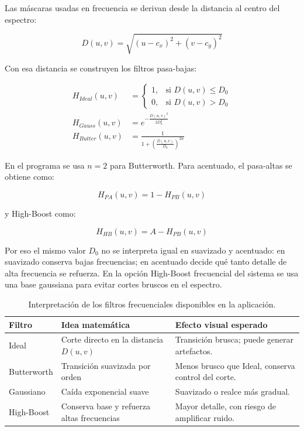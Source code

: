 \documentclass[11pt]{article}
\begin{document}
Las máscaras usadas en frecuencia se derivan desde la distancia al centro del espectro:

\begin{equation}
    D(u,v)=\sqrt{(u-c_x)^2+(v-c_y)^2}
\end{equation}

Con esa distancia se construyen los filtros pasa-bajas:

\begin{align}
    H_{Ideal}(u,v) &=
    \begin{cases}
        1, & \text{si } D(u,v)\leq D_0\\
        0, & \text{si } D(u,v)>D_0
    \end{cases} \\
    H_{Gauss}(u,v) &= e^{-\frac{D(u,v)^2}{2D_0^2}} \\
    H_{Butter}(u,v) &= \frac{1}{1+\left(\frac{D(u,v)}{D_0}\right)^{2n}}
\end{align}

En el programa se usa $n=2$ para Butterworth. Para acentuado, el pasa-altas se obtiene como:

\begin{equation}
    H_{PA}(u,v)=1-H_{PB}(u,v)
\end{equation}

y High-Boost como:

\begin{equation}
    H_{HB}(u,v)=A-H_{PB}(u,v)
\end{equation}

Por eso el mismo valor $D_0$ no se interpreta igual en suavizado y acentuado: en suavizado conserva bajas frecuencias; en acentuado decide qué tanto detalle de alta frecuencia se refuerza. En la opción High-Boost frecuencial del sistema se usa una base gaussiana para evitar cortes bruscos en el espectro.

\begin{table}[H]
    \centering
    \renewcommand{\arraystretch}{1.2}
    \begin{tabular}{|p{3.4cm}|p{5.4cm}|p{5.2cm}|}
        \hline
        \textbf{Filtro} & \textbf{Idea matemática} & \textbf{Efecto visual esperado} \\
        \hline
        Ideal & Corte directo en la distancia $D(u,v)$ & Transición brusca; puede generar artefactos. \\
        \hline
        Butterworth & Transición suavizada por orden & Menos brusco que Ideal, conserva control del corte. \\
        \hline
        Gaussiano & Caída exponencial suave & Suavizado o realce más gradual. \\
        \hline
        High-Boost & Conserva base y refuerza altas frecuencias & Mayor detalle, con riesgo de amplificar ruido. \\
        \hline
    \end{tabular}
    \caption{Interpretación de los filtros frecuenciales disponibles en la aplicación.}
    \label{tab:filtros_frecuencia}
\end{table}
\end{document}
